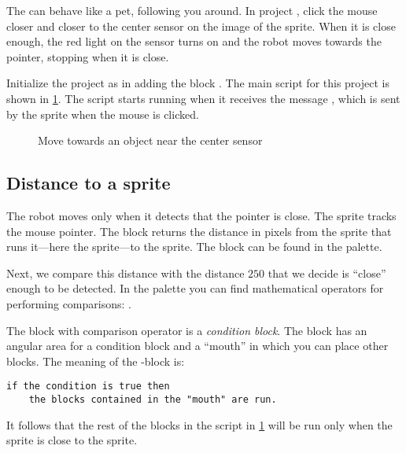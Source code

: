 

The  can behave like a pet, following you around. In project
, click the mouse closer and closer to the center sensor on
the image of the  sprite. When it is close enough, the red light
on the sensor turns on and the robot moves towards the pointer, stopping
when it is close.

Initialize the project as in  adding the block
. The main script for this project is
shown in \cref{fig.move-to}. The script starts running when it receives
the message , which is sent by the  sprite when the mouse
is clicked.

\begin{figure}
\caption{Move towards an object near the center sensor}\label{fig.move-to}
\end{figure}

\subsection*{Distance to a sprite}

The robot moves only when it detects that the pointer is close. The
sprite  tracks the mouse pointer. The block
 returns the distance in pixels from the
sprite that runs it---here the  sprite---to the  sprite.
The block can be found in the  palette.

Next, we compare this distance with the distance $250$ that we decide is
``close'' enough to be detected. In the palette  you can
find mathematical operators for performing comparisons:
.

The block with comparison operator is a \emph{condition block}. The
 block  has an angular area for a condition block
and a ``mouth'' in which you can place other blocks. The meaning of the
-block is:

\begin{footnotesize}
\begin{verbatim}
if the condition is true then
    the blocks contained in the "mouth" are run.
\end{verbatim}
\end{footnotesize}

It follows that the rest of the blocks in the script in
\cref{fig.move-to} will be run only when the  sprite is close to
the  sprite.

